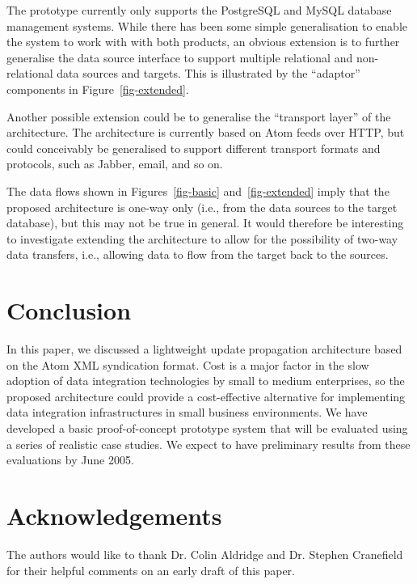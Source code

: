\documentclass{CRPITStyle}
\begin{document}
The prototype currently only supports the PostgreSQL and MySQL database
management systems. While there has been some simple generalisation to
enable the system to work with with both products, an obvious extension
is to further generalise the data source interface to support multiple
relational and non-relational data sources and targets. This is
illustrated by the ``adaptor'' components in Figure~\ref{fig-extended}.

Another possible extension could be to generalise the ``transport
layer'' of the architecture. The architecture is currently based on Atom
feeds over HTTP, but could conceivably be generalised to support
different transport formats and protocols, such as Jabber, email, and so
on.

The data flows shown in Figures~\ref{fig-basic} and~\ref{fig-extended}
imply that the proposed architecture is one-way only (i.e., from the
data sources to the target database), but this may not be true in
general. It would therefore be interesting to investigate extending the
architecture to allow for the possibility of two-way data transfers,
i.e., allowing data to flow from the target back to the sources.


\section{Conclusion}
\label{sec-conclusion}

In this paper, we discussed a lightweight update propagation
architecture based on the Atom XML syndication format. Cost is a major
factor in the slow adoption of data integration technologies by small to
medium enterprises, so the proposed architecture could provide a
cost-effective alternative for implementing data integration
infrastructures in small business environments. We have developed a
basic proof-of-concept prototype system that will be evaluated using a
series of realistic case studies. We expect to have preliminary results
from these evaluations by June 2005.


\section*{Acknowledgements}
\label{sec-acknowledgements}

The authors would like to thank Dr. Colin Aldridge and Dr. Stephen
Cranefield for their helpful comments on an early draft of this paper.




\end{document}
